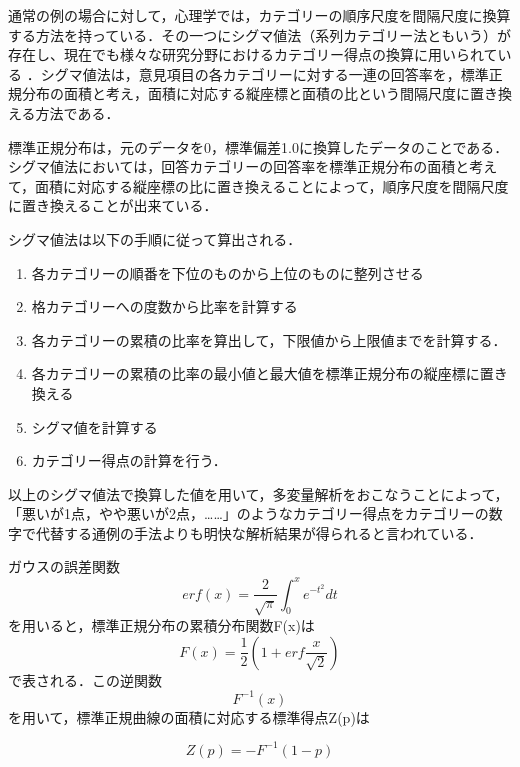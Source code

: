 \documentclass[shuuron]{kuee}
\begin{document}
通常の例の場合に対して，心理学では，カテゴリーの順序尺度を間隔尺度に換算する方法を持っている．その一つにシグマ値法（系列カテゴリー法ともいう）が存在し\cite{likert1932technique}、現在でも様々な研究分野におけるカテゴリー得点の換算に用いられている\cite{シグマ値法使ってる} \cite{岩本隆2016人事}．シグマ値法は，意見項目の各カテゴリーに対する一連の回答率を，標準正規分布の面積と考え，面積に対応する縦座標と面積の比という間隔尺度に置き換える方法である．

標準正規分布は，元のデータを0，標準偏差1.0に換算したデータのことである．シグマ値法においては，回答カテゴリーの回答率を標準正規分布の面積と考えて，面積に対応する縦座標の比に置き換えることによって，順序尺度を間隔尺度に置き換えることが出来ている．

シグマ値法は以下の手順に従って算出される．
\begin{enumerate}
 \item 各カテゴリーの順番を下位のものから上位のものに整列させる
 \item 格カテゴリーへの度数から比率を計算する
 \item 各カテゴリーの累積の比率を算出して，下限値から上限値までを計算する．
 \item 各カテゴリーの累積の比率の最小値と最大値を標準正規分布の縦座標に置き換える
 \item シグマ値を計算する
 \item カテゴリー得点の計算を行う．
\end{enumerate}

以上のシグマ値法で換算した値を用いて，多変量解析をおこなうことによって，「悪いが1点，やや悪いが2点，……」のようなカテゴリー得点をカテゴリーの数字で代替する通例の手法よりも明快な解析結果が得られると言われている．

ガウスの誤差関数
\begin{equation}
  erf(x) = \frac{2}{\sqrt{\pi}}\int_0^x e^{-t^2} dt
\end{equation}
を用いると，標準正規分布の累積分布関数F(x)は
\begin{equation}
  F(x) = \frac{1}{2}(1+erf\frac{x}{\sqrt{2}})
\end{equation}
で表される．この逆関数\begin{equation}F^{-1}(x)\end{equation}を用いて，標準正規曲線の面積に対応する標準得点Z(p)は


\begin{equation}
  Z(p) = -F^{-1}(1-p)
\end{equation}
\end{document}
